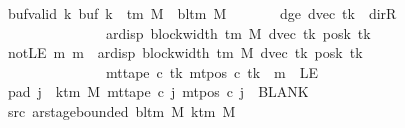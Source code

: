 \begin{isabellebody}
\ \ \ \ \ \ \ buf{\isacharunderscore}{\kern0pt}valid{\isacharcolon}{\kern0pt}\ {\isachardoublequoteopen}{\isasymforall}k{\isachardot}{\kern0pt}\ buf\ k\ {\isasymin}\ {\isasymGamma}{\isacharunderscore}{\kern0pt}tm\ M\ {\isasymunion}\ {\isacharbraceleft}{\kern0pt}bl{\isacharunderscore}{\kern0pt}tm\ M{\isacharbraceright}{\kern0pt}{\isachardoublequoteclose}\isanewline
\ \ \ \ \ \ \ dge{}{\isacharcolon}{\kern0pt}\ {\isachardoublequoteopen}dvec\ tk\ {\isasymnoteq}\ dir{\isachardot}{\kern0pt}R\isanewline
\ \ \ \ \ \ \ \ \ \ \ \ \ \ \ \ \ \ {\isasymLongrightarrow}\ {}\ {\isacharless}{\kern0pt}\ ar{\isacharunderscore}{\kern0pt}disp\ {\isacharparenleft}{\kern0pt}block{\isacharunderscore}{\kern0pt}width\ {\isacharparenleft}{\kern0pt}{\isasymGamma}{\isacharunderscore}{\kern0pt}tm\ M{\isacharparenright}{\kern0pt}{\isacharparenright}{\kern0pt}\ {\isacharparenleft}{\kern0pt}dvec\ tk{\isacharparenright}{\kern0pt}\ {\isacharparenleft}{\kern0pt}posk\ tk{\isacharparenright}{\kern0pt}{\isachardoublequoteclose}\isanewline
\ \ \ \ \ \ \ notLE{\isacharcolon}{\kern0pt}\ {\isachardoublequoteopen}{\isasymAnd}m{\isachardot}{\kern0pt}\ m\ {\isacharless}{\kern0pt}\ ar{\isacharunderscore}{\kern0pt}disp\ {\isacharparenleft}{\kern0pt}block{\isacharunderscore}{\kern0pt}width\ {\isacharparenleft}{\kern0pt}{\isasymGamma}{\isacharunderscore}{\kern0pt}tm\ M{\isacharparenright}{\kern0pt}{\isacharparenright}{\kern0pt}\ {\isacharparenleft}{\kern0pt}dvec\ tk{\isacharparenright}{\kern0pt}\ {\isacharparenleft}{\kern0pt}posk\ tk{\isacharparenright}{\kern0pt}\isanewline
\ \ \ \ \ \ \ \ \ \ \ \ \ \ \ \ \ \ \ \ {\isasymLongrightarrow}\ mt{\isacharunderscore}{\kern0pt}tape\ c{}\ tk\ {\isacharparenleft}{\kern0pt}mt{\isacharunderscore}{\kern0pt}pos\ c{}\ tk\ {\isacharminus}{\kern0pt}\ m{\isacharparenright}{\kern0pt}\ {\isasymnoteq}\ LE{}{\isachardoublequoteclose}\isanewline
\ \ \ \ \ \ \ pad{}{\isacharcolon}{\kern0pt}\ {\isachardoublequoteopen}{\isasymforall}j\ {\isasymge}\ k{\isacharunderscore}{\kern0pt}tm\ M{\isachardot}{\kern0pt}\ mt{\isacharunderscore}{\kern0pt}tape\ c{}\ j\ {\isacharparenleft}{\kern0pt}mt{\isacharunderscore}{\kern0pt}pos\ c{}\ j{\isacharparenright}{\kern0pt}\ {\isacharequal}{\kern0pt}\ BLANK{}{\isachardoublequoteclose}\isanewline
\ \ \ \ \ \ \ src{}{\isacharcolon}{\kern0pt}\ {\isachardoublequoteopen}ar{\isacharunderscore}{\kern0pt}stage{\isacharunderscore}{\kern0pt}bounded\ {\isacharparenleft}{\kern0pt}bl{\isacharunderscore}{\kern0pt}tm\ M{\isacharparenright}{\kern0pt}\ {\isacharparenleft}{\kern0pt}k{\isacharunderscore}{\kern0pt}tm\ M{\isacharparenright}{\kern0pt}\isanewline

\end{isabellebody}
